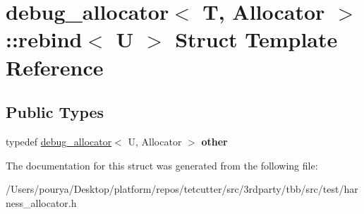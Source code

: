 \hypertarget{structdebug__allocator_1_1rebind}{}\section{debug\+\_\+allocator$<$ T, Allocator $>$\+:\+:rebind$<$ U $>$ Struct Template Reference}
\label{structdebug__allocator_1_1rebind}
\subsection*{Public Types}
\begin{DoxyCompactItemize}
\item 
\hypertarget{structdebug__allocator_1_1rebind_ad33c87bc8106458a3d5895c0dc208584}{}typedef \hyperlink{classdebug__allocator}{debug\+\_\+allocator}$<$ U, Allocator $>$ {\bfseries other}\label{structdebug__allocator_1_1rebind_ad33c87bc8106458a3d5895c0dc208584}

\end{DoxyCompactItemize}


The documentation for this struct was generated from the following file\+:\begin{DoxyCompactItemize}
\item 
/\+Users/pourya/\+Desktop/platform/repos/tetcutter/src/3rdparty/tbb/src/test/harness\+\_\+allocator.\+h\end{DoxyCompactItemize}
